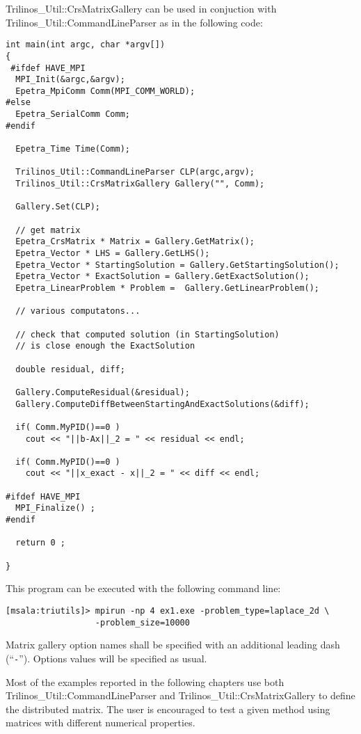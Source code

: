 Trilinos\_Util::CrsMatrixGallery can be used in conjuction with
Trilinos\_Util::CommandLineParser as in the following code:
\begin{verbatim}
int main(int argc, char *argv[]) 
{
 #ifdef HAVE_MPI
  MPI_Init(&argc,&argv);
  Epetra_MpiComm Comm(MPI_COMM_WORLD);
#else
  Epetra_SerialComm Comm;
#endif

  Epetra_Time Time(Comm);

  Trilinos_Util::CommandLineParser CLP(argc,argv);
  Trilinos_Util::CrsMatrixGallery Gallery("", Comm);

  Gallery.Set(CLP);

  // get matrix
  Epetra_CrsMatrix * Matrix = Gallery.GetMatrix();
  Epetra_Vector * LHS = Gallery.GetLHS();
  Epetra_Vector * StartingSolution = Gallery.GetStartingSolution();
  Epetra_Vector * ExactSolution = Gallery.GetExactSolution();
  Epetra_LinearProblem * Problem =  Gallery.GetLinearProblem();

  // various computatons...

  // check that computed solution (in StartingSolution) 
  // is close enough the ExactSolution

  double residual, diff;

  Gallery.ComputeResidual(&residual);
  Gallery.ComputeDiffBetweenStartingAndExactSolutions(&diff);
  
  if( Comm.MyPID()==0 ) 
    cout << "||b-Ax||_2 = " << residual << endl;

  if( Comm.MyPID()==0 ) 
    cout << "||x_exact - x||_2 = " << diff << endl;

#ifdef HAVE_MPI
  MPI_Finalize() ;
#endif

  return 0 ;

}
\end{verbatim}
This program can be executed with the following command line:
\begin{verbatim}
[msala:triutils]> mpirun -np 4 ex1.exe -problem_type=laplace_2d \
                  -problem_size=10000
\end{verbatim}
Matrix gallery option names shall be specified with an additional
leading dash (``\verb!-!''). Options values will be specified as usual.

\begin{remark}
  Most of the examples reported in the following chapters use both\newline
  Trilinos\_Util::CommandLineParser and Trilinos\_Util::CrsMatrixGallery
  to define the distributed matrix. The user is encouraged to test a
  given method using matrices with different numerical properties.
\end{remark}

